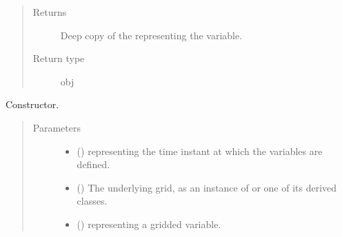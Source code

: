 \documentclass[letterpaper,10pt,english]{sphinxmanual}
\begin{document}
\begin{fulllineitems}
\begin{fulllineitems}
\begin{quote}
\begin{description}
\item[{Returns}] \leavevmode
Deep copy of the  representing the variable.

\item[{Return type}] \leavevmode
obj

\end{description}\end{quote}

\end{fulllineitems}


\begin{fulllineitems}
\label{\detokenize{api:storages.grid_data.GridData.__init__}}
Constructor.
\begin{quote}\begin{description}
\item[{Parameters}] \leavevmode\begin{itemize}
\item {} 
 () \textendash{}  representing the time instant at which the variables are defined.

\item {} 
 () \textendash{} The underlying grid, as an instance of {\hyperref[\detokenize{api:grids.grid_xyz.GridXYZ}]{}} or one of its derived classes.

\item {} 
 () \textendash{}  representing a gridded variable.

\end{itemize}

\end{description}\end{quote}

\end{fulllineitems}



\end{fulllineitems}
\end{document}
